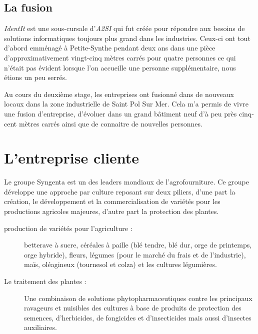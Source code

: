 
\subsection{La fusion} %
\label{sub:La fusion}

\emph{IdentIt} est une sous-cursale d'\emph{A2SI} qui fut créée pour
répondre aux besoins de solutions informatiques toujours plus grand dans
les industries. Ceux-ci ont tout d'abord emménagé à Petite-Synthe
pendant deux ans dans une pièce d'approximativement vingt-cinq mètres
carrés pour quatre personnes ce qui n'était pas évident lorsque l'on
accueille une personne supplémentaire, nous étions un peu serrés.

Au cours du deuxième stage, les entreprises ont \og fusionné \fg{} dans
de nouveaux locaux dans la zone industrielle de Saint Pol Sur Mer. Cela
m'a permis de vivre une fusion d'entreprise, d'évoluer dans un grand
bâtiment neuf d'à peu près cinq-cent mètres carrés ainsi que de
connaitre de nouvelles personnes.



\section{L'entreprise cliente} %
\label{sec:L'entreprise cliente}

Le groupe Syngenta est un des leaders mondiaux de l’agrofourniture.  Ce
groupe développe une approche par culture reposant sur deux piliers,
d'une part la création, le développement et la commercialisation de
variétés pour les productions agricoles majeures, d'autre part la
protection des plantes.

\begin{description}

  \item[production de variétés pour l'agriculture :] betterave à sucre,
    céréales à paille (blé tendre, blé dur, orge de printemps, orge
    hybride), fleurs, légumes (pour le marché du frais et de
    l’industrie), maïs, oléagineux (tournesol et colza) et les cultures
    légumières.

  \item[Le traitement des plantes :] Une combinaison de solutions
    phytopharmaceutiques contre les principaux ravageurs et nuisibles
    des cultures à base de produits de protection des semences,
    d’herbicides, de fongicides et d’insecticides mais aussi d’insectes
    auxiliaires.

\end{description}


